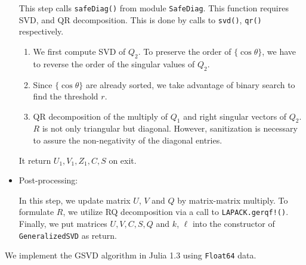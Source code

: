 \begin{itemize}
    This step calls \texttt{safeDiag()} from module \texttt{SafeDiag}. This function requires SVD, and QR decomposition. This is done by calls to \texttt{svd()}, \texttt{qr()} respectively. 
    \begin{enumerate}
    	\item We first compute SVD of $Q_{2}$. To preserve the order of $\{\cos\theta\}$, we have to reverse the order of the singular values of $Q_{2}$. 
		\item Since $\{\cos\theta\}$ are already sorted, we take advantage of binary search to find the threshold $r$.
		\item QR decomposition of the multiply of $Q_{1}$ and right singular vectors of $Q_{2}$. $R$ is not only triangular but diagonal. However, sanitization is necessary to assure the non-negativity of the diagonal entries. 
    \end{enumerate}
    
    It return $U_1, V_1, Z_1, C, S$ on exit.   

\item Post-processing:

    In this step, we update matrix $U$, $V$ and $Q$ by matrix-matrix multiply. To formulate $R$, we utilize RQ decomposition via a call to \texttt{LAPACK.gerqf!()}. Finally, we put matrices $U, V, C, S, Q$ and $k$, $\ell$ into the constructor of \texttt{GeneralizedSVD} as return. 

\end{itemize}
We implement the GSVD algorithm in Julia 1.3 using \texttt{Float64} data. 



